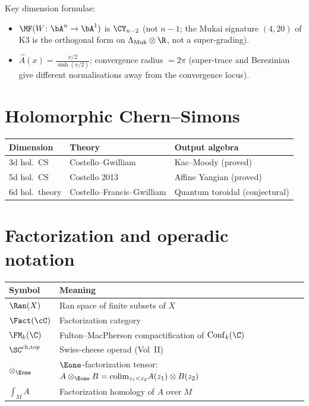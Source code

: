 \noindent
Key dimension formulae:
\begin{itemize}[nosep]
\item $\MF(W\colon \bA^n \to \bA^1)$ is $\CY_{n-2}$ (not $n-1$;
      the Mukai signature $(4,20)$ of K3 is the orthogonal form on
      $\Lambda_{\mathrm{Muk}} \otimes \R$, not a super-grading).
\item $\hat{A}(x) = \frac{x/2}{\sinh(x/2)}$; convergence radius $= 2\pi$
      (super-trace and Berezinian give different normalisations away from
      the convergence locus).
\end{itemize}

\section{Holomorphic Chern--Simons}
\label{sec:notation-hcs}

\begin{center}
\begin{tabular}{@{}lll@{}}
\toprule
\textbf{Dimension} & \textbf{Theory} & \textbf{Output algebra} \\
\midrule
3d hol.\ CS & Costello--Gwilliam & Kac--Moody (proved) \\
5d hol.\ CS & Costello 2013 & Affine Yangian (proved) \\
6d hol.\ theory & Costello--Francis--Gwilliam & Quantum toroidal (conjectural) \\
\bottomrule
\end{tabular}
\end{center}

\section{Factorization and operadic notation}
\label{sec:notation-fact}

\begin{center}
\begin{tabular}{@{}ll@{}}
\toprule
\textbf{Symbol} & \textbf{Meaning} \\
\midrule
$\Ran(X)$ & Ran space of finite subsets of $X$ \\
$\Fact(\cC)$ & Factorization category \\
$\FM_k(\C)$ & Fulton--MacPherson compactification of $\mathrm{Conf}_k(\C)$ \\
$\SC^{\mathrm{ch,top}}$ & Swiss-cheese operad (Vol~II) \\
$\otimes_{\Eone}$ & $\Eone$-factorization tensor: $A \otimes_{\Eone} B = \mathrm{colim}_{z_1 < z_2} A(z_1) \otimes B(z_2)$ \\
$\int_M A$ & Factorization homology of $A$ over $M$ \\
\bottomrule
\end{tabular}
\end{center}

